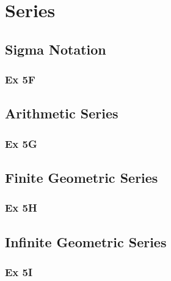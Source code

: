 \documentclass[12pt]{article}
\begin{document}
\section{Series}
\subsection{Sigma Notation}
\subsubsection{Ex 5F}
\subsection{Arithmetic Series}
\subsubsection{Ex 5G}
\subsection{Finite Geometric Series}
\subsubsection{Ex 5H}
\subsection{Infinite Geometric Series}
\subsubsection{Ex 5I}
\end{document}
